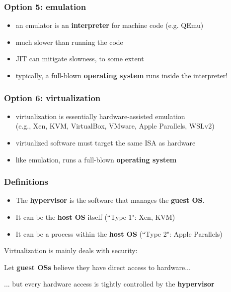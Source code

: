 \documentclass[12pt]{article}
\begin{document}
\subsubsection{Option 5: emulation}
\begin{itemize}
    \item an emulator is an \textbf{interpreter} for machine code (e.g. QEmu)
    \item much slower than running the code
    \item JIT can mitigate slowness, to some extent
    \item typically, a full-blown \textbf{operating system} runs inside the interpreter!
\end{itemize}

\subsubsection{Option 6: virtualization}

\begin{itemize}
    \item virtualization is essentially hardware-assisted emulation \\
    (e.g., Xen, KVM, VirtualBox, VMware, Apple Parallels, WSLv2)
    \item virtualized software must target the same ISA as hardware
    \item like emulation, runs a full-blown \textbf{operating system}
\end{itemize}


\subsubsection{Definitions}

\begin{itemize}
  \item The \textbf{hypervisor} is the software that manages the \textbf{guest OS}.
  \item It can be the \textbf{host OS} itself (``Type 1": Xen, KVM)
  \item It can be a process within the \textbf{host OS} (``Type 2": Apple Parallels)
\end{itemize}

Virtualization is mainly deals with security:

Let \textbf{guest OSs} believe they have direct access to hardware...

... but every hardware access is tightly controlled by the \textbf{hypervisor}
\end{document}
